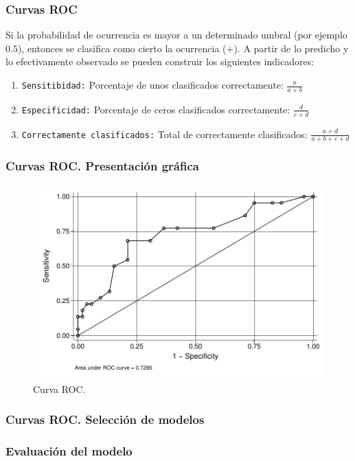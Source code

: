 \begin{frame}[fragile]
	\frametitle{Curvas ROC}
	Si la probabilidad de ocurrencia es mayor a un determinado umbral
	(por ejemplo $0.5$), entonces se clasifica como cierto la
	ocurrencia (+). A partir de lo predicho y lo efectivamente
	observado se pueden construir los siguientes indicadores:
	
	
	\begin{enumerate}
		\item \texttt{Sensitibidad:} Porcentaje de unos clasificados
		correctamente: $\frac{a}{a+b}$
		
		\item \texttt{Especificidad:} Porcentaje de ceros clasificados
		correctamente: $\frac{d}{c+d}$
		
		\item \texttt{Correctamente clasificados:} Total de correctamente clasificados: $\frac{a+d}{a+b+c+d}$
	\end{enumerate}
\end{frame}

\begin{frame}[fragile]
	\frametitle{Curvas ROC. Presentación gráfica}
	\begin{figure}
		\includegraphics[scale=.6]{fig/lroc}
		\caption{Curva ROC.}
	\end{figure}
\end{frame}

\begin{frame}[fragile]
	\frametitle{Curvas ROC. Selección de modelos}
	
\end{frame}



\subsubsection{Evaluación del modelo}

